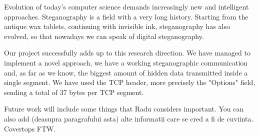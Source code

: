 
Evolution of today's computer science demands increasingly new and intelligent
approaches. Steganography is a field with a very long history. Starting from
the antique wax tablets, continuing with invisible ink, steganography has also
evolved, so that nowadays we can speak of digital steganography.

Our project successfully adds up to this research direction. We have managed to
implement a novel approach, we have a working steganographic communication and,
as far as we know, the biggest amount of hidden data transmitted inside a
single segment. We have used the TCP header, more precisely the "Options"
field, sending a total of 37 bytes per TCP segment.

Future work will include some things that Radu considers important.
You can also add (deasupra paragrafului asta) alte informatii care se cred a fi
de cuviinta. Covertops FTW.
